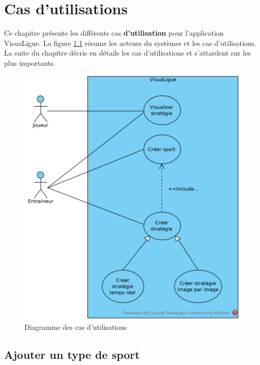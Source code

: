 
\chapter{Cas d'utilisations}
\label{s:cas_utilisation}

Ce chapitre présente les différents cas \textbf{d'utilisation} pour l'application VisuaLigue.
La figure \ref{fig:cas_utilisation_diag} résume les acteurs du systèmes et les cas d'utilisations.
La suite du chapitre décris en détails les cas d'utilisations et s'attardent sur les plus importants.

\begin{figure}[htpb]
    \centering
    \includegraphics[scale=0.7]{fig/cas_utilisation_diag.png}
    \caption{Diagramme des cas d'utilisations}
    \label{fig:cas_utilisation_diag}
\end{figure}

\newpage

\section{Ajouter un type de sport}
\label{sec:ajouter_un_type_de_sport}

